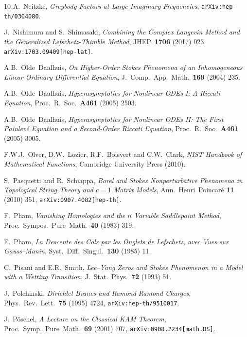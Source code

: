 \documentclass[11pt,a4paper]{article}
\begin{document}
\begin{thebibliography}{10}
A.~Neitzke,
\textit{Greybody Factors at Large Imaginary Frequencies},
\texttt{arXiv:hep-th/0304080}.

J.~Nishimura and S.~Shimasaki,
\textit{Combining the Complex Langevin Method and the Generalized Lefschetz-Thimble Method},
JHEP\ \textbf{1706} (2017) 023,
\texttt{arXiv:1703.09409[hep-lat]}.

A.B.~Olde~Daalhuis,
\textit{On Higher-Order Stokes Phenomena of an Inhomogeneous Linear Ordinary Differential Equation},
J.\ Comp.\ App.\ Math.\ \textbf{169} (2004) 235.

A.B.~Olde~Daalhuis,
\textit{Hyperasymptotics for Nonlinear ODEs I: A Riccati Equation},
Proc.\ R.\ Soc.\ \textbf{A461} (2005) 2503.

A.B.~Olde~Daalhuis,
\textit{Hyperasymptotics for Nonlinear ODEs II: The First Painlev\'e Equation and a Second-Order Riccati Equation},
Proc.\ R.\ Soc.\ \textbf{A461} (2005) 3005.

F.W.J.~Olver, D.W.~Lozier, R.F.~Boisvert and C.W.~Clark,
\textit{NIST Handbook of Mathematical Functions},
Cambridge University Press (2010).

S.~Pasquetti and R.~Schiappa,
\textit{Borel and Stokes Nonperturbative Phenomena in Topological String Theory and $c=\text{1}$ Matrix Models},
Ann.\ Henri\ Poincar\'e \textbf{11} (2010) 351,
\texttt{arXiv:0907.4082[hep-th]}.

F.~Pham,
\textit{Vanishing Homologies and the $n$ Variable Saddlepoint Method},
Proc.\ Sympos.\ Pure\ Math.\ \textbf{40} (1983) 319.

F.~Pham,
\textit{La Descente des Cols par les Onglets de Lefschetz, avec Vues sur Gauss--Manin},
Syst.\ Diff.\ Singul.\ \textbf{130} (1985) 11.

C.~Pisani and E.R.~Smith,
\textit{Lee--Yang Zeros and Stokes Phenomenon in a Model with a Wetting Transition},
J.\ Stat.\ Phys.\ \textbf{72} (1993) 51.

J.~Polchinski,
\textit{Dirichlet Branes and Ramond-Ramond Charges},
Phys.\ Rev.\ Lett.\ \textbf{75} (1995) 4724,
\texttt{arXiv:hep-th/9510017}.

J.~P\"oschel,
\textit{A Lecture on the Classical KAM Theorem},
Proc.\ Symp.\ Pure\ Math.\ \textbf{69} (2001) 707,
\texttt{arXiv:0908.2234[math.DS]}.


\end{thebibliography}
\end{document}
